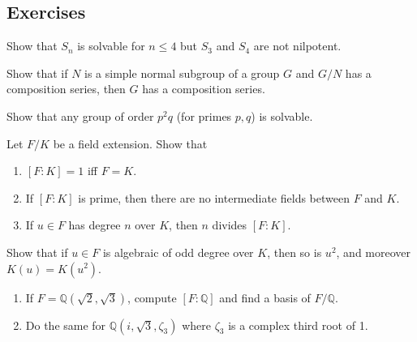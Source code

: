 
\subsection{Exercises}
\begin{problem}[Hungerford 2.7.10]
\label{prob:3.1}
Show that $S_n$ is solvable for $n\leq 4$ but $S_3$ and $S_4$ are not nilpotent.
\end{problem}

\begin{problem}[Hungerford 2.8.3]
\label{prob:3.2}
Show that if $N$ is a simple normal subgroup of a group $G$ and $G/N$ has a composition series, then $G$ has a composition series.
\end{problem}

\begin{problem}[Hungerford 2.8.9]
\label{prob:3.3}
Show that any group of order $p^2 q$ (for primes $p,q$) is solvable.
\end{problem}

\begin{problem}[Hungerford 5.1.1]
Let $F/K$ be a field extension. Show that
\begin{enumerate}
    \item $[F: K] = 1$ iff $F = K$.
    \item If $[F: K]$ is prime, then there are no intermediate fields between $F$ and $K$.
    \item If $u\in F$ has degree $n$ over $K$, then $n$ divides $[F: K]$.
\end{enumerate}
\label{prob:3.4}
\end{problem}

\begin{problem}[Hungerford 5.1.8]
\label{prob:3.5}
Show that if $u\in F$ is algebraic of odd degree over $K$, then so is $u^2$, and moreover $K(u) = K(u^2)$.
\end{problem}

\begin{problem}[Hungerford 5.1.14]
\begin{enumerate}
    \item If $F = \mathbb{Q}(\sqrt 2, \sqrt 3)$, compute $[F: \mathbb{Q}]$ and find a basis of $F/\mathbb{Q}$.
    \item Do the same for $\mathbb{Q}(i, \sqrt 3, \zeta_3)$ where $\zeta_3$ is a complex third root of 1.
\end{enumerate}
\label{prob:3.6}
\end{problem}

